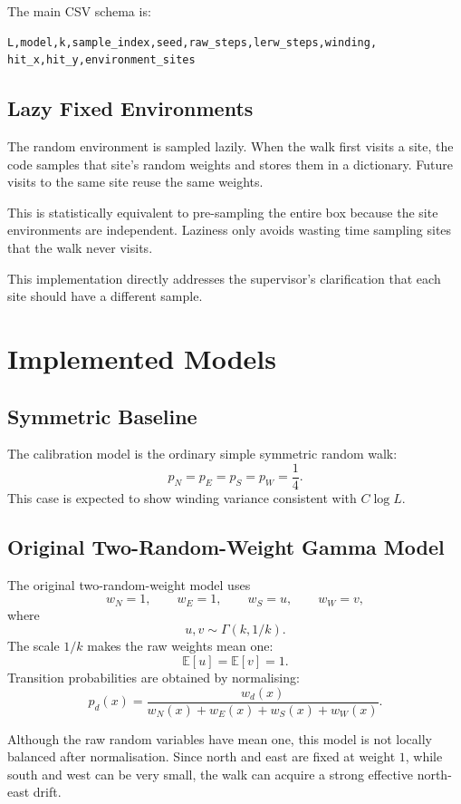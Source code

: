 \documentclass[11pt]{article}
\begin{document}
The main CSV schema is:
\begin{verbatim}
L,model,k,sample_index,seed,raw_steps,lerw_steps,winding,
hit_x,hit_y,environment_sites
\end{verbatim}

\subsection{Lazy Fixed Environments}

The random environment is sampled lazily. When the walk first visits a site,
the code samples that site's random weights and stores them in a dictionary.
Future visits to the same site reuse the same weights.

This is statistically equivalent to pre-sampling the entire box because the
site environments are independent. Laziness only avoids wasting time sampling
sites that the walk never visits.

This implementation directly addresses the supervisor's clarification that
each site should have a different sample.

\section{Implemented Models}

\subsection{Symmetric Baseline}

The calibration model is the ordinary simple symmetric random walk:
\[
  p_N=p_E=p_S=p_W=\frac14.
\]
This case is expected to show winding variance consistent with $C\log L$.

\subsection{Original Two-Random-Weight Gamma Model}

The original two-random-weight model uses
\[
  w_N=1,\qquad w_E=1,\qquad w_S=u,\qquad w_W=v,
\]
where
\[
  u,v \sim \Gamma(k,1/k).
\]
The scale $1/k$ makes the raw weights mean one:
\[
  \mathbb{E}[u]=\mathbb{E}[v]=1.
\]
Transition probabilities are obtained by normalising:
\[
  p_d(x)=\frac{w_d(x)}{w_N(x)+w_E(x)+w_S(x)+w_W(x)}.
\]

Although the raw random variables have mean one, this model is not locally
balanced after normalisation. Since north and east are fixed at weight $1$,
while south and west can be very small, the walk can acquire a strong effective
north-east drift.
\end{document}
